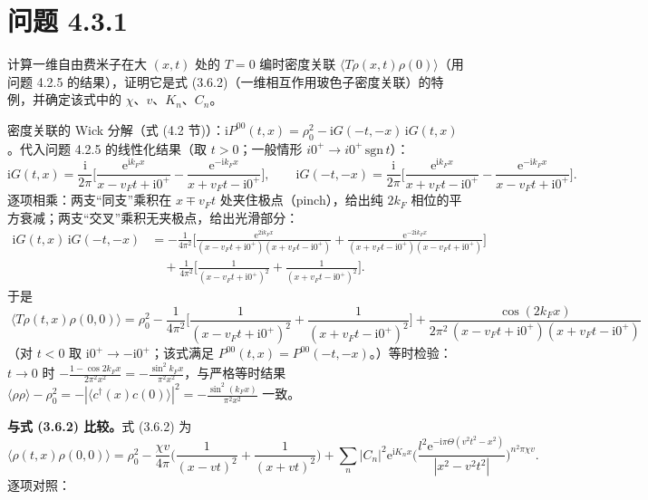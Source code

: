 \section*{问题 4.3.1}
\begin{problem}
计算一维自由费米子在大 $(x,t)$ 处的 $T=0$ 编时密度关联 $\langle T\rho(x,t)\rho(0)\rangle$（用问题 4.2.5 的结果），证明它是式 (3.6.2)（一维相互作用玻色子密度关联）的特例，并确定该式中的 $\chi$、$v$、$K_n$、$C_n$。
\end{problem}
\solution
密度关联的 Wick 分解（式 (4.2 节)）：$\mathrm{i}P^{00}(t,x)=\rho_0^2-\mathrm{i}G(-t,-x)\,\mathrm{i}G(t,x)$。代入问题 4.2.5 的线性化结果（取 $t>0$；一般情形 $i0^+\to i0^+\,\mathrm{sgn}\,t$）：
\begin{equation*}
\mathrm{i}G(t,x)=\frac{\mathrm{i}}{2\pi}\Big[\frac{\mathrm{e}^{\mathrm{i}k_Fx}}{x-v_Ft+\mathrm{i}0^+}-\frac{\mathrm{e}^{-\mathrm{i}k_Fx}}{x+v_Ft-\mathrm{i}0^+}\Big],
\qquad
\mathrm{i}G(-t,-x)=\frac{\mathrm{i}}{2\pi}\Big[\frac{\mathrm{e}^{\mathrm{i}k_Fx}}{x+v_Ft-\mathrm{i}0^+}-\frac{\mathrm{e}^{-\mathrm{i}k_Fx}}{x-v_Ft+\mathrm{i}0^+}\Big].
\end{equation*}
逐项相乘：两支“同支”乘积在 $x\mp v_Ft$ 处夹住极点（pinch），给出纯 $2k_F$ 相位的平方衰减；两支“交叉”乘积无夹极点，给出光滑部分：
\begin{align*}
\mathrm{i}G(t,x)\,\mathrm{i}G(-t,-x)
&=-\frac{1}{4\pi^2}\Big[\frac{\mathrm{e}^{2\mathrm{i}k_Fx}}{(x-v_Ft+\mathrm{i}0^+)(x+v_Ft-\mathrm{i}0^+)}+\frac{\mathrm{e}^{-2\mathrm{i}k_Fx}}{(x+v_Ft-\mathrm{i}0^+)(x-v_Ft+\mathrm{i}0^+)}\Big]\\
&\quad+\frac{1}{4\pi^2}\Big[\frac{1}{(x-v_Ft+\mathrm{i}0^+)^2}+\frac{1}{(x+v_Ft-\mathrm{i}0^+)^2}\Big].
\end{align*}
于是
\begin{equation*}
\boxed{\;\langle T\rho(t,x)\rho(0,0)\rangle=\rho_0^2
-\frac{1}{4\pi^2}\Big[\frac{1}{(x-v_Ft+\mathrm{i}0^+)^2}+\frac{1}{(x+v_Ft-\mathrm{i}0^+)^2}\Big]
+\frac{\cos(2k_Fx)}{2\pi^2\,(x-v_Ft+\mathrm{i}0^+)(x+v_Ft-\mathrm{i}0^+)}\;}
\end{equation*}
（对 $t<0$ 取 $\mathrm{i}0^+\to-\mathrm{i}0^+$；该式满足 $P^{00}(t,x)=P^{00}(-t,-x)$。）等时检验：$t\to0$ 时 $-\frac{1-\cos2k_Fx}{2\pi^2x^2}=-\frac{\sin^2k_Fx}{\pi^2x^2}$，与严格等时结果 $\langle\rho\rho\rangle-\rho_0^2=-|\langle c^\dagger(x)c(0)\rangle|^2=-\frac{\sin^2(k_Fx)}{\pi^2x^2}$ 一致。

\textbf{与式 (3.6.2) 比较。}式 (3.6.2) 为
\begin{equation*}
\langle\rho(t,x)\rho(0,0)\rangle
=\rho_0^2-\frac{\chi v}{4\pi}\Big(\frac{1}{(x-vt)^2}+\frac{1}{(x+vt)^2}\Big)
+\sum_n|C_n|^2\mathrm{e}^{\mathrm{i}K_nx}
\Big(\frac{l^2\mathrm{e}^{-\mathrm{i}\pi\Theta(v^2t^2-x^2)}}{|x^2-v^2t^2|}\Big)^{n^2\pi\chi v}.
\end{equation*}
逐项对照：

